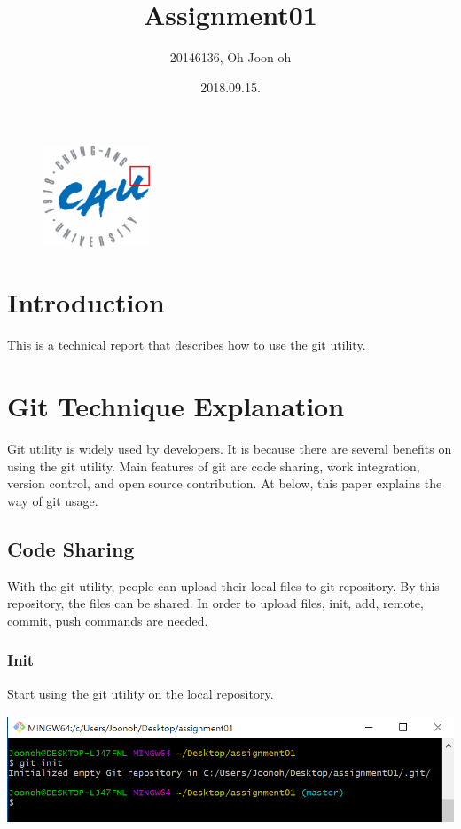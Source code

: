 \documentclass[18pt]{article}%
\begin{document}
\begin{figure}
\includegraphics[height=3cm]{logo.jpg}
\end{figure}
\title{Assignment01}
\author{20146136, Oh Joon-oh}
\date{2018.09.15.}
\maketitle
\section{Introduction}

This is a technical report that describes how to use the git utility.

\section{Git Technique Explanation}
Git utility is widely used by developers. It is because there are several benefits on using the git utility. Main features of git are code sharing, work integration, version control, and open source contribution. At below, this paper explains the way of git usage.

\subsection {Code Sharing}
With the git utility, people can upload their local files to git repository. By this repository, the files can be shared.
In order to upload files, init, add, remote, commit, push commands are needed.


\subsubsection {Init}
Start using the git utility on the local repository.\\
\includegraphics[height=4cm]{init.PNG}
\end{document}
